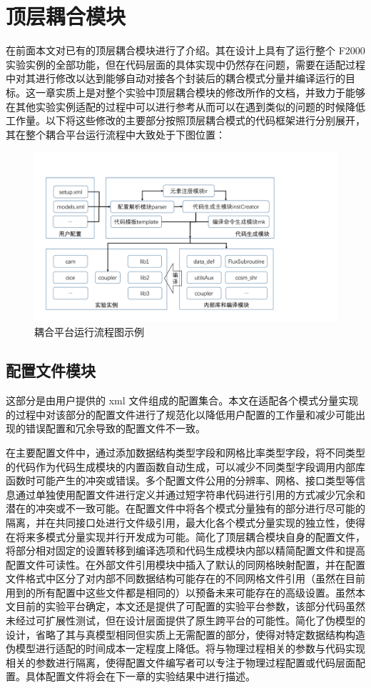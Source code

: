 \chapter{顶层耦合模块}
\label{cha:coupler}

在前面本文对已有的顶层耦合模块进行了介绍。其在设计上具有了运行整个 F2000 实验实例的全部功能，但在代码层面的具体实现中仍然存在问题，需要在适配过程中对其进行修改以达到能够自动对接各个封装后的耦合模式分量并编译运行的目标。这一章实质上是对整个实验中顶层耦合模块的修改所作的文档，并致力于能够在其他实验实例适配的过程中可以进行参考从而可以在遇到类似的问题的时候降低工作量。以下将这些修改的主要部分按照顶层耦合模式的代码框架进行分别展开，其在整个耦合平台运行流程中大致处于下图位置：
\begin{figure}[H]
\centering
\includegraphics[width=1\textwidth]{../figures/fig1.pdf}
\caption{耦合平台运行流程图示例}
\end{figure}

\section{配置文件模块}

这部分是由用户提供的 xml 文件组成的配置集合。本文在适配各个模式分量实现的过程中对该部分的配置文件进行了规范化以降低用户配置的工作量和减少可能出现的错误配置和冗余导致的配置文件不一致。

在主要配置文件中，通过添加数据结构类型字段和网格比率类型字段，将不同类型的代码作为代码生成模块的内置函数自动生成，可以减少不同类型字段调用内部库函数时可能产生的冲突或错误。多个配置文件公用的分辨率、网格、接口类型等信息通过单独使用配置文件进行定义并通过短字符串代码进行引用的方式减少冗余和潜在的冲突或不一致可能。在配置文件中将各个模式分量独有的部分进行尽可能的隔离，并在共同接口处进行文件级引用，最大化各个模式分量实现的独立性，使得在将来多模式分量实现并行开发成为可能。简化了顶层耦合模块自身的配置文件，将部分相对固定的设置转移到编译选项和代码生成模块内部以精简配置文件和提高配置文件可读性。在外部文件引用模块中插入了默认的同网格映射配置，并在配置文件格式中区分了对内部不同数据结构可能存在的不同网格文件引用（虽然在目前用到的所有配置中这些文件都是相同的）以预备未来可能存在的高级设置。虽然本文目前的实验平台确定，本文还是提供了可配置的实验平台参数，该部分代码虽然未经过可扩展性测试，但在设计层面提供了原生跨平台的可能性。简化了伪模型的设计，省略了其与真模型相同但实质上无需配置的部分，使得对特定数据结构构造伪模型进行适配的时间成本一定程度上降低。将与物理过程相关的参数与代码实现相关的参数进行隔离，使得配置文件编写者可以专注于物理过程配置或代码层面配置。具体配置文件将会在下一章的实验结果中进行描述。

